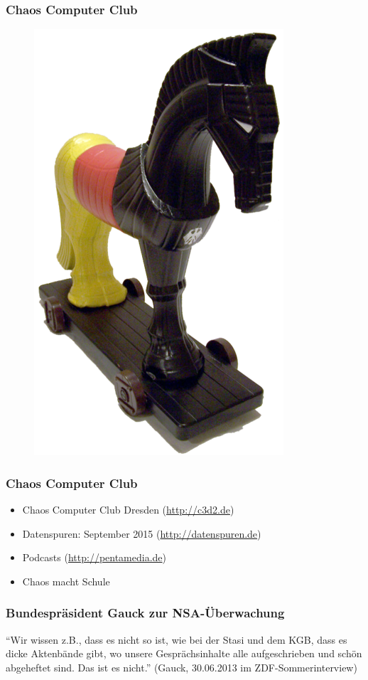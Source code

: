 \documentclass[12pt]{beamer}
\begin{document}
\begin{frame}
  \frametitle{Chaos Computer Club}
  \begin{figure}
    \includegraphics[height=0.7\textheight]{img/trojaner.png}
  \end{figure}
\end{frame}

\begin{frame}
    \frametitle{Chaos Computer Club}
    \begin{itemize}
      \item<1-> Chaos Computer Club Dresden (\url{http://c3d2.de})          
      \item<2-> Datenspuren: September 2015 (\url{http://datenspuren.de})
      \item<3-> Podcasts (\url{http://pentamedia.de})
      \item<4-> Chaos macht Schule
    \end{itemize}
\end{frame}

\begin{frame}
    \frametitle{Bundespräsident Gauck zur NSA-Überwachung}
    \begin{center}
      ``Wir wissen z.B., dass es nicht so ist, wie bei der Stasi und dem KGB, dass es dicke Aktenbände gibt, wo unsere Gesprächsinhalte alle aufgeschrieben und schön abgeheftet sind. Das ist es nicht.''
      (Gauck, 30.06.2013 im ZDF-Sommerinterview)
    \end{center}
\end{frame}
\end{document}
